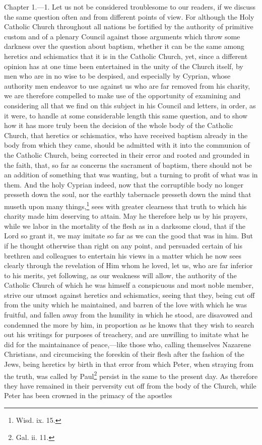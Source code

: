 Chapter 1.—1. Let us not be considered troublesome to our readers, if we discuss the same question often and from different points of view. For although the Holy Catholic Church throughout all nations be fortified by the authority of primitive custom and of a plenary Council against those arguments which throw some darkness over the question about baptism, whether it can be the same among heretics and schismatics that it is in the Catholic Church, yet, since a different opinion has at one time been entertained in the unity of the Church itself, by men who are in no wise to be despised, and especially by Cyprian, whose authority men endeavor to use against us who are far removed from his charity, we are therefore compelled to make use of the opportunity of examining and considering all that we find on this subject in his Council and letters, in order, as it were, to handle at some considerable length this same question, and to show how it has more truly been the decision of the whole body of the Catholic Church, that heretics or schismatics, who have received baptism already in the body from which they came, should be admitted with it into the communion of the Catholic Church, being corrected in their error and rooted and grounded in the faith, that, so far as concerns the sacrament of baptism, there should not be an addition of something that was wanting, but a turning to profit of what was in them. And the holy Cyprian indeed, now that the corruptible body no longer presseth down the soul, nor the earthly tabernacle presseth down the mind that museth upon many things,\footnote{\par  Wisd. ix. 15.} sees with greater clearness that truth to which his charity made him deserving to attain. May he therefore help us by his prayers, while we labor in the mortality of the flesh as in a darksome cloud, that if the Lord so grant it, we may imitate so far as we can the good that was in him. But if he thought otherwise than right on any point, and persuaded certain of his brethren and colleagues to entertain his views in a matter which he now sees clearly through the revelation of Him whom he loved, let us, who are far inferior to his merits, yet following, as our weakness will allow, the authority of the Catholic Church of which he was himself a conspicuous and most noble member, strive our utmost against heretics and schismatics, seeing that they, being cut off from the unity which he maintained, and barren of the love with which he was fruitful, and fallen away from the humility in which he stood, are disavowed and condemned the more by him, in proportion as he knows that they wish to search out his writings for purposes of treachery, and are unwilling to imitate what he did for the maintainance of peace,—like those who, calling themselves Nazarene Christians, and circumcising the foreskin of their flesh after the fashion of the Jews, being heretics by birth in that error from which Peter, when straying from the truth, was called by Paul\footnote{\par  Gal. ii. 11.} persist in the same to the present day. As therefore they have remained in their perversity cut off from the body of the Church, while Peter has been crowned in the primacy of the apostles 